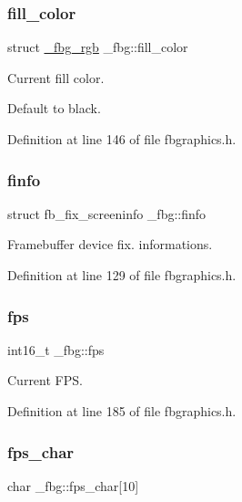 \subsubsection{\texorpdfstring{fill\+\_\+color}{fill\_color}}
{\footnotesize\ttfamily struct \mbox{\hyperlink{fbgraphics_8h_struct__fbg__rgb}{\+\_\+fbg\+\_\+rgb}} \+\_\+fbg\+::fill\+\_\+color}



Current fill color. 

Default to black. 

Definition at line 146 of file fbgraphics.\+h.

\mbox{\label{struct__fbg_a954dd14a4129eed7ebe09f31bd025861}} 
\subsubsection{\texorpdfstring{finfo}{finfo}}
{\footnotesize\ttfamily struct fb\+\_\+fix\+\_\+screeninfo \+\_\+fbg\+::finfo}



Framebuffer device fix. informations. 



Definition at line 129 of file fbgraphics.\+h.

\mbox{\label{struct__fbg_a64b16363bc48d1e19141df2e242930a9}} 
\subsubsection{\texorpdfstring{fps}{fps}}
{\footnotesize\ttfamily int16\+\_\+t \+\_\+fbg\+::fps}



Current F\+PS. 



Definition at line 185 of file fbgraphics.\+h.

\mbox{\label{struct__fbg_af447e6ed58d893989c8dad075807a79b}} 
\subsubsection{\texorpdfstring{fps\+\_\+char}{fps\_char}}
{\footnotesize\ttfamily char \+\_\+fbg\+::fps\+\_\+char\mbox{[}10\mbox{]}}




